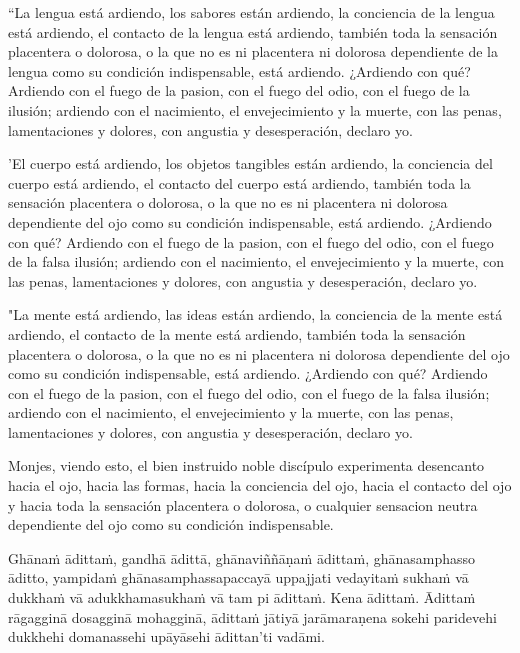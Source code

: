 “La lengua está ardiendo, los sabores están ardiendo, la conciencia de la lengua está ardiendo, el contacto de la lengua está ardiendo, también toda la sensación placentera o dolorosa, o la que no es ni placentera ni dolorosa dependiente de la lengua como su condición indispensable, está ardiendo. ¿Ardiendo con qué? Ardiendo con el fuego de la pasion, con el fuego del odio, con el fuego de la ilusión; ardiendo con el nacimiento, el envejecimiento y la muerte, con las penas, lamentaciones y dolores, con angustia y desesperación, declaro yo.


'El cuerpo está ardiendo, los objetos tangibles están ardiendo, la conciencia del cuerpo está ardiendo, el contacto del cuerpo está ardiendo, también toda la sensación placentera o dolorosa, o la que no es ni placentera ni dolorosa dependiente del ojo como su condición indispensable, está ardiendo. ¿Ardiendo con qué? Ardiendo con el fuego de la pasion, con el fuego del odio, con el fuego de la falsa ilusión; ardiendo con el nacimiento, el envejecimiento y la muerte, con las penas, lamentaciones y dolores, con angustia y desesperación, declaro yo.

"La mente está ardiendo, las ideas están ardiendo, la conciencia de la mente está ardiendo, el contacto de la mente está ardiendo, también toda la sensación placentera o dolorosa, o la que no es ni placentera ni dolorosa dependiente del ojo como su condición indispensable, está ardiendo. ¿Ardiendo con qué? Ardiendo con el fuego de la pasion, con el fuego del odio, con el fuego de la falsa ilusión; ardiendo con el nacimiento, el envejecimiento y la muerte, con las penas, lamentaciones y dolores, con angustia y desesperación, declaro yo.

Monjes, viendo esto, el bien instruido noble discípulo experimenta desencanto hacia el ojo, hacia las formas, hacia la conciencia del ojo, hacia el contacto del ojo y hacia toda la sensación placentera o dolorosa, o cualquier sensacion neutra dependiente del ojo como su condición indispensable. 



\clearpage

\paliText
\markboth{\paliTitle}{\rightmark}

Ghānaṁ ādittaṁ, gandhā ādittā, ghānaviññāṇaṁ ādittaṁ, ghānasamphasso
āditto, yampidaṁ ghānasamphassapaccayā uppajjati vedayitaṁ sukhaṁ vā
dukkhaṁ vā adukkhamasukhaṁ vā tam pi ādittaṁ. Kena ādittaṁ. Ādittaṁ
rāgagginā dosagginā mohagginā, ādittaṁ jātiyā jarāmaraṇena sokehi
paridevehi dukkhehi domanassehi upāyāsehi ādittan'ti vadāmi.

